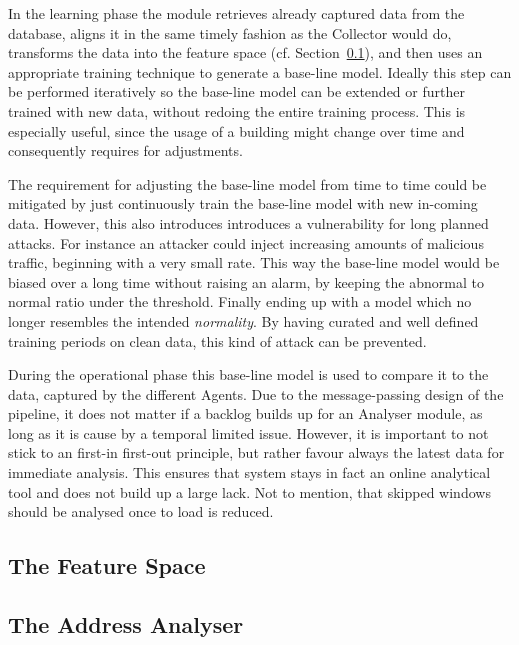 In the learning phase the module retrieves already captured data from the database, aligns it in the same timely fashion as the Collector would do, transforms the data into the feature space (cf. Section~\ref{sec:concept:anal:feature-vector}), and then uses an appropriate training technique to generate a base-line model.
Ideally this step can be performed iteratively so the base-line model can be extended or further trained with new data, without redoing the entire training process. This is especially useful, since the usage of a building might change over time and consequently requires for adjustments.

The requirement for adjusting the base-line model from time to time could be mitigated by just continuously train the base-line model with new in-coming data.
However, this also introduces introduces a vulnerability for long planned attacks. For instance an attacker could inject increasing amounts of malicious traffic, beginning with a very small rate. This way the base-line model would be biased over a long time without raising an alarm, by keeping the abnormal to normal ratio under the threshold. Finally ending up with a model which no longer resembles the intended \emph{normality}.
By having curated and well defined training periods on clean data, this kind of attack can be prevented.

During the operational phase this base-line model is used to compare it to the data, captured by the different Agents.
Due to the message-passing design of the pipeline, it does not matter if a backlog builds up for an Analyser module, as long as it is cause by a temporal limited issue.
However, it is important to not stick to an first-in first-out principle, but rather favour always the latest data for immediate analysis. This ensures that system stays in fact an online analytical tool and does not build up a large lack. Not to mention, that skipped windows should be analysed once to load is reduced.

\subsection{The Feature Space}
\label{sec:concept:anal:feature-vector}

\subsection{The Address Analyser}
\label{sec:concept:anal:addr}

